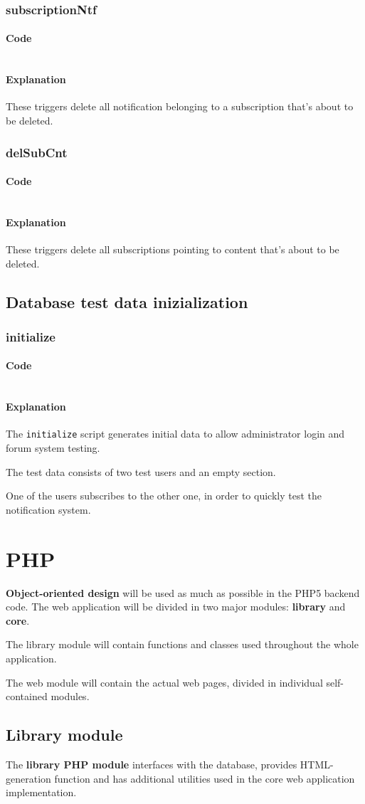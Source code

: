 \documentclass[12pt]{report}
\renewcommand\emph{\textbf}
\newcommand{\printSQLtest}[1]
{
    \inputminted[linenos, breaklines, breakbytoken, tabsize=4, fontsize=\footnotesize]{mysql}{#1}
}
\newcommand{\printSQLTablepage}[2]
{    
    \subsection{#2}
    \subsubsection{Code}
    \printSQLtest{../sql/parts/#1}
    \subsubsection{Explanation}
}
\begin{document}
                \newpage

                \printSQLTablepage{94_trgDelSubscriptionNtf.sql}{subscriptionNtf}
                    These triggers delete all notification belonging to a subscription that's about to be deleted.

                \newpage

                \printSQLTablepage{95_trgDelSubCnt.sql}{delSubCnt}
                    These triggers delete all subscriptions pointing to content that's about to be deleted.

                \newpage

            \section{Database test data inizialization}

                \printSQLTablepage{99_initialize.sql}{initialize}
                    The \texttt{initialize} script generates initial data to allow administrator login and forum system testing.

                    The test data consists of two test users and an empty section.

                    One of the users subscribes to the other one, in order to quickly test the notification system.

                \newpage

        \chapter{PHP}

            \emph{Object-oriented design} will be used as much as possible in the PHP5 backend code. The web application will be divided in two major modules: \emph{library} and \emph{core}.

            The library module will contain functions and classes used throughout the whole application.
            
            The web module will contain the actual web pages, divided in individual self-contained modules. 

            \section{Library module}

                The \emph{library PHP module} interfaces with the database, provides HTML-generation function and has additional utilities used in the core web application implementation.
\end{document}
